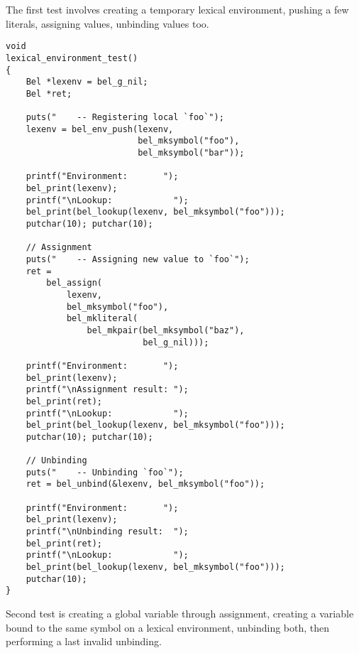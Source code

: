 \documentclass[openright,a4paper,twoside,12pt]{memoir}
\begin{document}
The first test involves creating a temporary lexical environment,
pushing a few literals, assigning values, unbinding values too.

\begin{verbatim}
void
lexical_environment_test()
{
    Bel *lexenv = bel_g_nil;
    Bel *ret;

    puts("    -- Registering local `foo`");
    lexenv = bel_env_push(lexenv,
                          bel_mksymbol("foo"),
                          bel_mksymbol("bar"));
    
    printf("Environment:       ");
    bel_print(lexenv);
    printf("\nLookup:            ");
    bel_print(bel_lookup(lexenv, bel_mksymbol("foo")));
    putchar(10); putchar(10);

    // Assignment
    puts("    -- Assigning new value to `foo`");
    ret =
        bel_assign(
            lexenv,
            bel_mksymbol("foo"),
            bel_mkliteral(
                bel_mkpair(bel_mksymbol("baz"),
                           bel_g_nil)));

    printf("Environment:       ");
    bel_print(lexenv);
    printf("\nAssignment result: ");
    bel_print(ret);
    printf("\nLookup:            ");
    bel_print(bel_lookup(lexenv, bel_mksymbol("foo")));
    putchar(10); putchar(10);

    // Unbinding
    puts("    -- Unbinding `foo`");
    ret = bel_unbind(&lexenv, bel_mksymbol("foo"));
    
    printf("Environment:       ");
    bel_print(lexenv);
    printf("\nUnbinding result:  ");
    bel_print(ret);
    printf("\nLookup:            ");
    bel_print(bel_lookup(lexenv, bel_mksymbol("foo")));
    putchar(10);
}
\end{verbatim}

Second test is creating a global variable through assignment, creating
a variable bound to the same symbol on a lexical environment,
unbinding both, then performing a last invalid unbinding.
\end{document}
